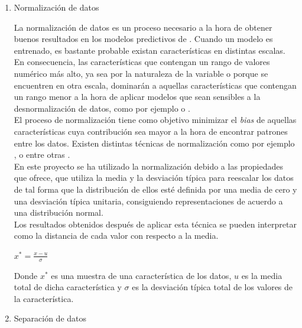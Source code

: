 \begin{enumerate}
                \item Normalización de datos


                    La normalización de datos es un proceso necesario a la hora de obtener buenos resultados en los modelos predictivos de . Cuando un modelo es entrenado, es bastante probable existan características en distintas escalas. En consecuencia, las características que contengan un rango de valores numérico más alto, ya sea por la naturaleza de la variable o porque se encuentren en otra escala, dominarán a aquellas características que contengan un rango menor a la hora de aplicar modelos  que sean sensibles a la desnormalización de datos, como por ejemplo  o  \cite{NormalizationSensitiveModels}.\\


                    El proceso de normalización tiene como objetivo minimizar el \textit{bias} de aquellas características cuya contribución sea mayor a la hora de encontrar patrones entre los datos. Existen distintas técnicas de normalización como por ejemplo ,  o  entre otras \cite{DataNormalizationInvestigation}.\\


                    En este proyecto se ha utilizado la normalización  debido a las propiedades que ofrece,  que utiliza la media y la desviación típica para reescalar los datos de tal forma que la distribución de ellos esté definida por una media de cero y una desviación típica unitaria, consiguiendo representaciones de acuerdo a una distribución normal.\\

                    Los resultados obtenidos después de aplicar esta técnica se pueden interpretar como la distancia de cada valor con respecto a la media.

                   \begin{center}
                        $x^* = \frac{x - u}{\sigma}$
                    \end{center}


                    Donde $x^*$ es una muestra de una característica de los datos, $u$ es la media total de dicha característica y $\sigma$ es la desviación típica total de los valores de la característica.


                \item Separación de datos


\end{enumerate}
